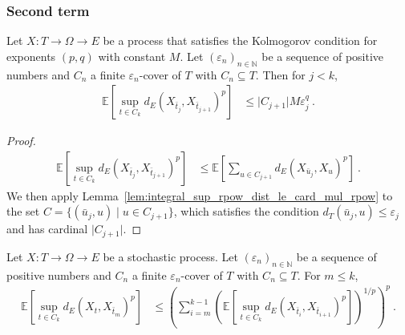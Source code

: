 \subsubsection{Second term}


\begin{lemma}\label{lem:integral_sup_rpow_dist_succ}
  \leanok
Let $X : T \to \Omega \to E$ be a process that satisfies the Kolmogorov condition for exponents $(p,q)$ with constant $M$.
Let $(\varepsilon_n)_{n \in \mathbb{N}}$ be a sequence of positive numbers and $C_n$ a finite $\varepsilon_n$-cover of $T$ with $C_n \subseteq T$.
Then for $j < k$,
\begin{align*}
  \mathbb{E}\left[\sup_{t \in C_k} d_E(X_{\bar{t}_j}, X_{\bar{t}_{j+1}})^p \right]
  &\le \vert C_{j+1} \vert M \varepsilon_j^q
  \: .
\end{align*}
\end{lemma}

\begin{proof}
\begin{align*}
  \mathbb{E}\left[\sup_{t \in C_k} d_E(X_{\bar{t}_j}, X_{\bar{t}_{j+1}})^p \right]
  &\le \mathbb{E}\left[\sum_{u \in C_{j+1}} d_E(X_{\bar{u}_j}, X_{u})^p \right]
  \: .
\end{align*}
We then apply Lemma~\ref{lem:integral_sup_rpow_dist_le_card_mul_rpow} to the set $C = \{(\bar{u}_j, u) \mid u \in C_{j+1}\}$, which satisfies the condition $d_T(\bar{u}_j, u) \le \varepsilon_j$ and has cardinal $\vert C_{j+1} \vert$.
\end{proof}


\begin{lemma}\label{lem:integral_sup_dist_le_sum_rpow}
  \leanok
Let $X : T \to \Omega \to E$ be a stochastic process.
Let $(\varepsilon_n)_{n \in \mathbb{N}}$ be a sequence of positive numbers and $C_n$ a finite $\varepsilon_n$-cover of $T$ with $C_n \subseteq T$.
For $m \le k$,
\begin{align*}
  \mathbb{E}\left[\sup_{t \in C_k} d_E(X_t, X_{\bar{t}_m})^p \right]
  &\le \left(\sum_{i=m}^{k-1} \left( \mathbb{E}\left[\sup_{t \in C_k} d_E(X_{\bar{t}_i}, X_{\bar{t}_{i+1}})^p\right] \right)^{1/p}\right)^p
  \: .
\end{align*}
\end{lemma}

